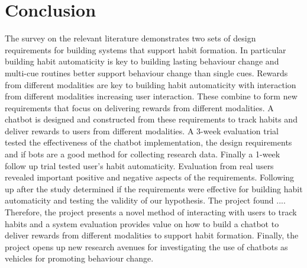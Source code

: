 
\newpage
\section{Conclusion}

The survey on the relevant literature demonstrates two sets of design requirements for building systems that support habit formation.
In particular building habit automaticity is key to building lasting behaviour change and multi-cue routines better support behaviour change than single cues.
Rewards from different modalities are key to building habit automaticity with interaction from different modalities increasing user interaction.
These combine to form new requirements that focus on delivering rewards from different modalities.\newline
\newline
A chatbot is designed and constructed from these requirements to track habits and deliver rewards to users from different modalities.
A 3-week evaluation trial tested the effectiveness of the chatbot implementation, the design requirements and if bots are a good method for collecting research data.
Finally a 1-week follow up trial tested user's habit automaticity.\newline
\newline
Evaluation from real users revealed important positive and negative aspects of the requirements.
Following up after the study determined if the requirements were effective for building habit automaticity and testing the validity of our hypothesis.\newline
The project found ....\newline
\newline
Therefore, the project presents a novel method of interacting with users to track habits and a system evaluation provides value
on how to build a chatbot to deliver rewards from different modalities to support habit formation.
Finally, the project opens up new research avenues for investigating the use of chatbots as vehicles for promoting behaviour change.
